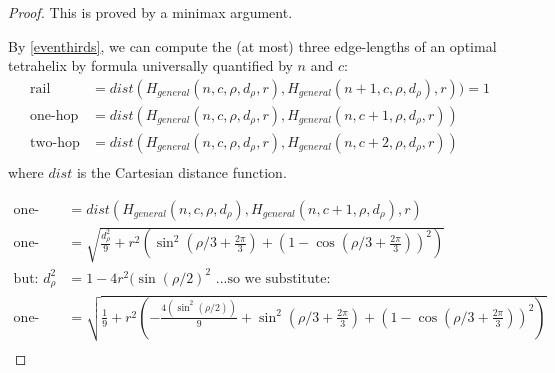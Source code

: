 \documentclass[review]{siamonline1116}
\begin{document}
\begin{proof}
This is proved by a minimax argument.

By \cref{eventhirds}, we can compute the (at most) three edge-lengths of an optimal
tetrahelix by formula universally quantified by $n$ and $c$:
\begin{align*}
  \text{rail} &= dist(H_{general}(n,c,\rho,d_{\rho},r),H_{general}(n+1,c,\rho,d_{\rho}),r)) = 1 \\
  \text{one-hop} &= dist(H_{general}(n,c,\rho,d_{\rho},r),H_{general}(n,c+1,\rho,d_{\rho},r))  \\
  \text{two-hop} &= dist(H_{general}(n,c,\rho,d_{\rho},r),H_{general}(n,c+2,\rho,d_{\rho},r))  \\  
\end{align*}
where $dist$ is the Cartesian distance function.


\begin{align*}
  \text{one-hop} &= dist(H_{general}(n,c,\rho,d_{\rho}),H_{general}(n,c+1,\rho,d_{\rho}),r)  \\
  \text{one-hop}  &= \sqrt{\frac{d_{\rho}^2}{9} + r^2(\sin^2(\rho/3 + \frac{2\pi}{3})  + (1 - \cos(\rho/3 + \frac{2\pi}{3}))^2)} \\
  \text{but: }  d_{\rho}^2 &= 1 - 4 r^2 (\sin( \rho / 2)^2 \text{ ...so we substitute:}\\
  \text{one-hop}  &= \sqrt{\frac{1}{9}  + r^2(-\frac{4 (\sin^2( \rho / 2))}{9} + \sin^2(\rho/3+ \frac{2\pi}{3})  + (1 - \cos(\rho/3 + \frac{2\pi}{3}))^2)} \\
\end{align*}


\end{proof}
\end{document}
